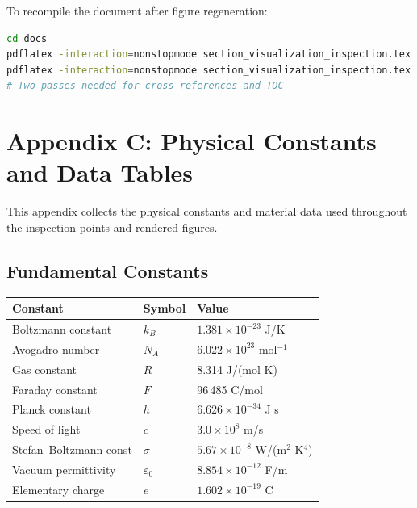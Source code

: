 \documentclass[11pt,a4paper]{article}
\begin{document}
To recompile the document after figure regeneration:

\begin{lstlisting}[language=bash,title={\textbf{Compile the LaTeX document}}]
cd docs
pdflatex -interaction=nonstopmode section_visualization_inspection.tex
pdflatex -interaction=nonstopmode section_visualization_inspection.tex
# Two passes needed for cross-references and TOC
\end{lstlisting}

\section{Appendix C: Physical Constants and Data Tables}
\label{sec:appendix_data}

This appendix collects the physical constants and material data used
throughout the inspection points and rendered figures.

\subsection{Fundamental Constants}

\begin{center}
\begin{tabular}{lll}
\toprule
\textbf{Constant} & \textbf{Symbol} & \textbf{Value} \\
\midrule
Boltzmann constant      & $k_B$      & $1.381 \times 10^{-23}$ J/K \\
Avogadro number         & $N_A$      & $6.022 \times 10^{23}$ mol$^{-1}$ \\
Gas constant            & $R$        & 8.314 J/(mol K) \\
Faraday constant        & $F$        & 96\,485 C/mol \\
Planck constant         & $h$        & $6.626 \times 10^{-34}$ J s \\
Speed of light          & $c$        & $3.0 \times 10^{8}$ m/s \\
Stefan--Boltzmann const & $\sigma$   & $5.67 \times 10^{-8}$ W/(m$^2$ K$^4$) \\
Vacuum permittivity     & $\varepsilon_0$ & $8.854 \times 10^{-12}$ F/m \\
Elementary charge       & $e$        & $1.602 \times 10^{-19}$ C \\
\bottomrule
\end{tabular}
\end{center}
\end{document}

